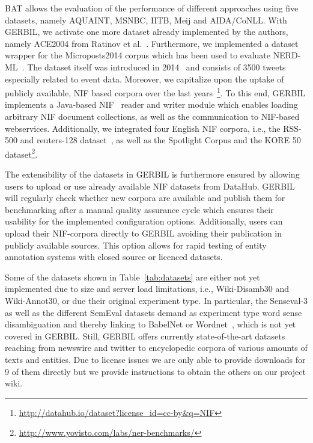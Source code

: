 BAT allows the evaluation of the performance of different a\-ppro\-aches using five datasets, namely AQUAINT, MSNBC, IITB, Meij and AIDA/CoNLL.
With GERBIL, we activate one more dataset already implemented by the authors, namely ACE2004 from Ratinov et al.~\cite{rat:rot}.
Furthermore, we implemented a dataset wrapper for the Microposts2014 corpus which has been used to evaluate NERD-ML~\cite{rizzo2014}. 
The dataset itself was introduced in 2014~\cite{Cano2014} and consists of 3500 tweets especially related to event data.
Moreover, we capitalize upon the uptake of publicly available, NIF based corpora over the last years~\cite{steinmetz-n-2013-statistical,n3}\footnote{\url{http://datahub.io/dataset?license_id=cc-by&q=NIF}}.
To this end, GERBIL implements a Java-based NIF~\cite{NIF} reader and writer module which enables loading arbitrary NIF document collections, as well as the communication to NIF-based webservices.
Additionally, we integrated four English NIF corpora, i.e., the RSS-500 and reuters-128 dataset~\cite{n3}, as well as the Spotlight Corpus and the KORE 50 dataset\footnote{\url{http://www.yovisto.com/labs/ner-benchmarks/}}. 

The extensibility of the datasets in GERBIL is furthermore ensured by allowing users to upload or use already available NIF datasets from DataHub. 
GERBIL will regularly check whether new corpora are available and publish them for benchmarking after a manual quality assurance cycle which ensures their usability for the implemented configuration options.
Additionally, users can upload their NIF-corpora directly to GERBIL avoiding their publication in publicly available sources.
This option allows for rapid testing of entity annotation systems with closed source or licenced datasets.

Some of the datasets shown in Table~\ref{tab:datasets} are either not yet implemented due to size and server load limitations, i.e., Wiki-Disamb30 and Wiki-Annot30, or due their original experiment type.
In particular, the Senseval-3 as well as the different SemEval datasets demand as experiment type word sense disambiguation and thereby linking to BabelNet or Wordnet~\cite{wordnet}, which is not yet covered in GERBIL.
Still, GERBIL offers currently \overalldatasets state-of-the-art datasets reaching from newswire and twitter to encyclopedic corpora of various amounts of texts and entities.
Due to license issues we are only able to provide downloads for 9 of them directly but we provide instructions to obtain the others on our project wiki.

